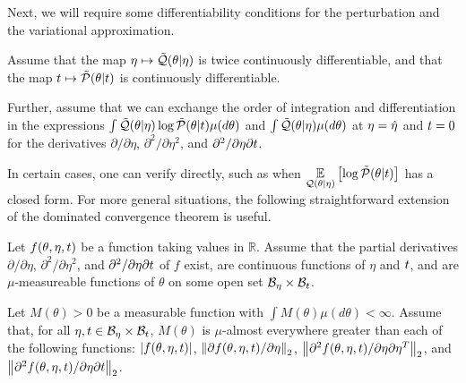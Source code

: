 Next, we will require some differentiability conditions for the perturbation and
the variational approximation.

%
\begin{assu}
%
Assume that the map $\eta \mapsto \tilde{\mathcal{Q}}(\theta \vert \eta)$ is twice
continuously differentiable, and that the map $t \mapsto \tilde{\mathcal{P}}(\theta \vert
t)$ is continuously differentiable.

Further, assume that we can exchange the order of integration and
differentiation in the expressions $\int \tilde{\mathcal{Q}}(\theta \vert \eta) \log
\tilde{\mathcal{P}}(\theta \vert t) \mu(d\theta)$ and $\int \tilde{\mathcal{Q}}(\theta \vert \eta)
\mu(d\theta)$ at $\eta = \hat\eta$ and $t = 0$ for the derivatives $\partial /
\partial \eta$, $\partial^2 / \partial \eta^2$, and $\partial^2 / \partial \eta
\partial t$.
%
\end{assu}

In certain cases, one can verify  directly, such as when
$\underset{\mathcal{Q}(\theta \vert \eta)}{\mathbb{E}}\left[\log \tilde{\mathcal{P}}(\theta \vert t)\right]$ has a closed form.
For more general situations, the following straightforward extension of the
dominated convergence theorem \citep[Theorem 16.8]{billingsley:1986:probability}
is useful.

%
\begin{assu}
%
Let $f(\theta, \eta, t)$ be a function taking values in $\mathbb{R}$. Assume
that the partial derivatives $\partial / \partial \eta$, $\partial^2 / \partial
\eta^2$, and $\partial^2 / \partial \eta \partial t$ of $f$ exist, are
continuous functions of $\eta$ and $t$, and are $\mu$-measureable functions of
$\theta$ on some open set $\mathcal{B}_\eta \times \mathcal{B}_t$.

Let $M(\theta) > 0$ be a measurable function with $\int M(\theta) \mu(d\theta) <
\infty$.  Assume that, for all $\eta, t \in \mathcal{B}_\eta \times \mathcal{B}_t$,
$M(\theta)$ is $\mu$-almost everywhere greater than each of the following
functions: $\left|f(\theta, \eta, t)\right|$, $\left\Vert\partial f(\theta, \eta, t) /
\partial \eta\right\Vert_2$, $\left\Vert\partial^2 f(\theta, \eta, t) / \partial \eta
\partial \eta^T\right\Vert_2$, and $\left\Vert\partial^2 f(\theta, \eta, t) / \partial \eta
\partial t\right\Vert_2$.
%
\end{assu}
%

